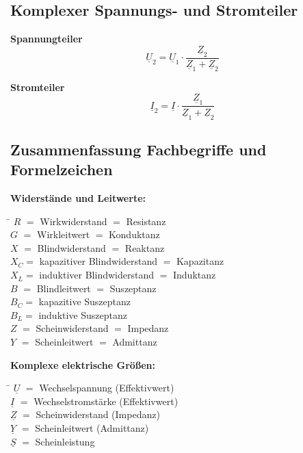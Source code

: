 \documentclass[a4paper,12pt]{article}
\begin{document}
	\subsection*{Komplexer Spannungs- und Stromteiler}
	\textbf{Spannungteiler}
	$$\underline{U}_2 = \underline{U}_1 \cdot \frac{\underline{Z}_2}{\underline{Z}_1 + \underline{Z}_2}$$
	
	\textbf{Stromteiler}
	$$\underline{I}_2 = \underline{I} \cdot \frac{\underline{Z}_1}{\underline{Z}_1 + \underline{Z}_2}$$
	
	
	
	\subsection*{Zusammenfassung Fachbegriffe und Formelzeichen}
	
	\textbf{Widerstände und Leitwerte:}
	\begin{tabbing}
		\hspace{1.5cm} \= \kill
		$R$ \> $=$ Wirkwiderstand $=$ Resistanz \\
		$G$ \> $=$ Wirkleitwert $=$ Konduktanz \\
		$X$ \> $=$ Blindwiderstand $=$ Reaktanz \\
		\> $X_C =$ kapazitiver Blindwiderstand $=$ Kapazitanz \\
		\> $X_L =$ induktiver Blindwiderstand $=$ Induktanz \\
		$B$ \> $=$ Blindleitwert $=$ Suszeptanz \\
		\> $B_C =$ kapazitive Suszeptanz \\
		\> $B_L =$ induktive Suszeptanz \\
		$Z$ \> $=$ Scheinwiderstand $=$ Impedanz \\
		$Y$ \> $=$ Scheinleitwert $=$ Admittanz \\
	\end{tabbing}
	
	\textbf{Komplexe elektrische Größen:}
	\begin{tabbing}
		\hspace{1.5cm} \= \kill
		$\underline{U}$ \> $=$ Wechselspannung (Effektivwert) \\
		$\underline{I}$ \> $=$ Wechselstromstärke (Effektivwert) \\
		$\underline{Z}$ \> $=$ Scheinwiderstand (Impedanz) \\
		$\underline{Y}$ \> $=$ Scheinleitwert (Admittanz) \\
		$\underline{S}$ \> $=$ Scheinleistung \\
	\end{tabbing}
	
\end{document}
